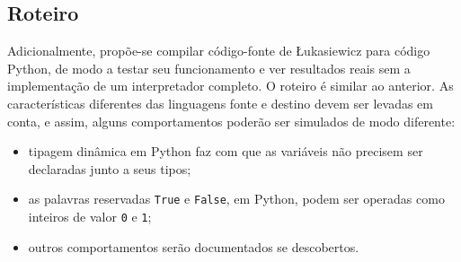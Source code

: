 \documentclass{article}
\newenvironment{smallitem}{
    \vspace{-1mm}
    \begin{itemize}
    \setlength{\parskip}{0pt}
    \setlength{\itemsep}{2pt}
}{
    \vspace{-2mm}
    \end{itemize}
}
\begin{document}
\subsection{Roteiro}

Adicionalmente, propõe-se compilar código-fonte de Łukasiewicz para código Python, de
modo a testar seu funcionamento e ver resultados reais sem a implementação de um
interpretador completo. O roteiro é similar ao anterior. As características
diferentes das linguagens fonte e destino devem ser levadas em conta, e assim,
alguns comportamentos poderão ser simulados de modo diferente:

\begin{smallitem}
    \item tipagem dinâmica em Python faz com que as variáveis não precisem ser
        declaradas junto a seus tipos;
    \item as palavras reservadas \texttt{True} e \texttt{False}, em Python, podem
        ser operadas como inteiros de valor \texttt{0} e \texttt{1};
    \item outros comportamentos serão documentados se descobertos.
\end{smallitem}
\end{document}

